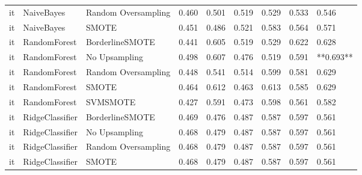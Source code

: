 \begin{tabular}{lllllllll}
      it &                      NaiveBayes &           Random Oversampling & 0.460 &                     0.501 &                 0.519 &                  0.529 &                                   0.533 &     0.546 \\
      it &                      NaiveBayes &                         SMOTE & 0.451 &                     0.486 &                 0.521 &                  0.583 &                                   0.564 &     0.571 \\
      it &                    RandomForest &               BorderlineSMOTE & 0.441 &                     0.605 &                 0.519 &                  0.529 &                                   0.622 &     0.628 \\
      it &                    RandomForest &                 No Upsampling & 0.498 &                     0.607 &                 0.476 &                  0.519 &                                   0.591 & **0.693** \\
      it &                    RandomForest &           Random Oversampling & 0.448 &                     0.541 &                 0.514 &                  0.599 &                                   0.581 &     0.629 \\
      it &                    RandomForest &                         SMOTE & 0.464 &                     0.612 &                 0.463 &                  0.613 &                                   0.585 &     0.629 \\
      it &                    RandomForest &                      SVMSMOTE & 0.427 &                     0.591 &                 0.473 &                  0.598 &                                   0.561 &     0.582 \\
      it &                 RidgeClassifier &               BorderlineSMOTE & 0.469 &                     0.476 &                 0.487 &                  0.587 &                                   0.597 &     0.561 \\
      it &                 RidgeClassifier &                 No Upsampling & 0.468 &                     0.479 &                 0.487 &                  0.587 &                                   0.597 &     0.561 \\
      it &                 RidgeClassifier &           Random Oversampling & 0.468 &                     0.479 &                 0.487 &                  0.587 &                                   0.597 &     0.561 \\
      it &                 RidgeClassifier &                         SMOTE & 0.468 &                     0.479 &                 0.487 &                  0.587 &                                   0.597 &     0.561 \\

\end{tabular}
